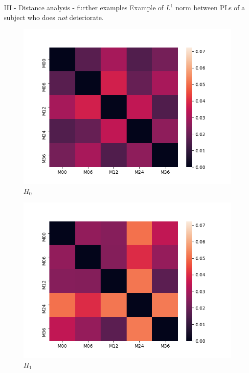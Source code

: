 \documentclass[aspectratio=169, 10pt, dvipsnames]{beamer}
\begin{document}
\begin{frame}[fragile]{III - Distance analysis - further examples}
  Example of $L^1$ norm between PLs of a subject who does \emph{not} deteriorate.\\
  \begin{figure}
    \centering
    \includegraphics[width=\textwidth]{figures/temporal_evolution/ADNI011S0023_h_0.png}
    \caption{$H_0$}
  \end{figure}
  \endminipage
  \hfill
  \begin{figure}
    \centering
    \includegraphics[width=\textwidth]{figures/temporal_evolution/ADNI011S0023_h_1.png}
    \caption{$H_1$}
  \end{figure}%

\end{frame}
\end{document}
